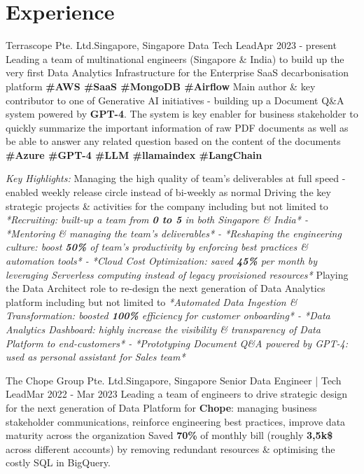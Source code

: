 \section{Experience}
  \resumeSubHeadingListStart
    
    \resumeSubheading
      {Terrascope Pte. Ltd.}{Singapore, Singapore}
      {Data Tech Lead}{Apr 2023 - present}
      \resumeItemListStart
          {Leading a team of multinational engineers (Singapore \& India) to build up the very first Data Analytics Infrastructure for the Enterprise SaaS decarbonisation platform \textbf{\scriptsize{\#AWS \#SaaS \#MongoDB \#Airflow}}}
          {Main author \& key contributor to one of Generative AI initiatives - building up a Document Q\&A system powered by \textbf{GPT-4}. The system is key enabler for business stakeholder to quickly summarize the important information of raw PDF documents as well as be able to answer any related question based on the content of the documents \textbf{\scriptsize{\#Azure \#GPT-4 \#LLM \#llamaindex \#LangChain}}}
      \resumeItemListEnd
      
      \emph{Key Highlights:}
      \resumeItemListStart
          {Managing the high quality of team's deliverables at full speed - enabled weekly release circle instead of bi-weekly as normal}
          {Driving the key strategic projects \& activities for the company including but not limited to \emph{*Recruiting: built-up a team from \textbf{0 to 5} in both Singapore \& India* - *Mentoring \& managing the team's deliverables* - *Reshaping the engineering culture: boost \textbf{50\%} of team's productivity by enforcing best practices \& automation tools* - *Cloud Cost Optimization: saved \textbf{45\%} per month by leveraging Serverless computing instead of legacy provisioned resources*}}
          {Playing the Data Architect role to re-design the next generation of Data Analytics platform including but not limited to \emph{*Automated Data Ingestion \& Transformation: boosted \textbf{100\%} efficiency for customer onboarding* - *Data Analytics Dashboard: highly increase the visibility \& transparency of Data Platform to end-customers* - *Prototyping Document Q\&A powered by GPT-4: used as personal assistant for Sales team*}}
      \resumeItemListEnd

    \resumeSubheading
      {The Chope Group Pte. Ltd.}{Singapore, Singapore}
      {Senior Data Engineer | Tech Lead}{Mar 2022 - Mar 2023}
      \resumeItemListStart
          {Leading a team of engineers to drive strategic design for the next generation of Data Platform  for \textbf{Chope}: managing business stakeholder communications, reinforce engineering best practices, improve data maturity across the organization}
          {Saved \textbf{70\%} of monthly bill (roughly \textbf{3,5k\$} across different accounts) by removing redundant resources \& optimising the costly SQL in BigQuery.}
      \resumeItemListEnd


